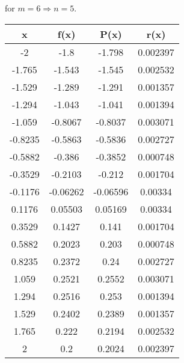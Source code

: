 \documentclass{article}
\begin{document}
for $ m = 6\Rightarrow n = 5 $.
\begin{center}\begin{tabular}{|c|c|c|c|}
\hline
x &f(x) &P(x) &r(x)\\\hline 
-2 &-1.8 &-1.798 &0.002397 \\\hline 
-1.765 &-1.543 &-1.545 &0.002532 \\\hline 
-1.529 &-1.289 &-1.291 &0.001357 \\\hline 
-1.294 &-1.043 &-1.041 &0.001394 \\\hline 
-1.059 &-0.8067 &-0.8037 &0.003071 \\\hline 
-0.8235 &-0.5863 &-0.5836 &0.002727 \\\hline 
-0.5882 &-0.386 &-0.3852 &0.000748 \\\hline 
-0.3529 &-0.2103 &-0.212 &0.001704 \\\hline 
-0.1176 &-0.06262 &-0.06596 &0.00334 \\\hline 
0.1176 &0.05503 &0.05169 &0.00334 \\\hline 
0.3529 &0.1427 &0.141 &0.001704 \\\hline 
0.5882 &0.2023 &0.203 &0.000748 \\\hline 
0.8235 &0.2372 &0.24 &0.002727 \\\hline 
1.059 &0.2521 &0.2552 &0.003071 \\\hline 
1.294 &0.2516 &0.253 &0.001394 \\\hline 
1.529 &0.2402 &0.2389 &0.001357 \\\hline 
1.765 &0.222 &0.2194 &0.002532 \\\hline 
2 &0.2 &0.2024 &0.002397 \\\hline 
\end{tabular}
\end{center}
\end{document}
